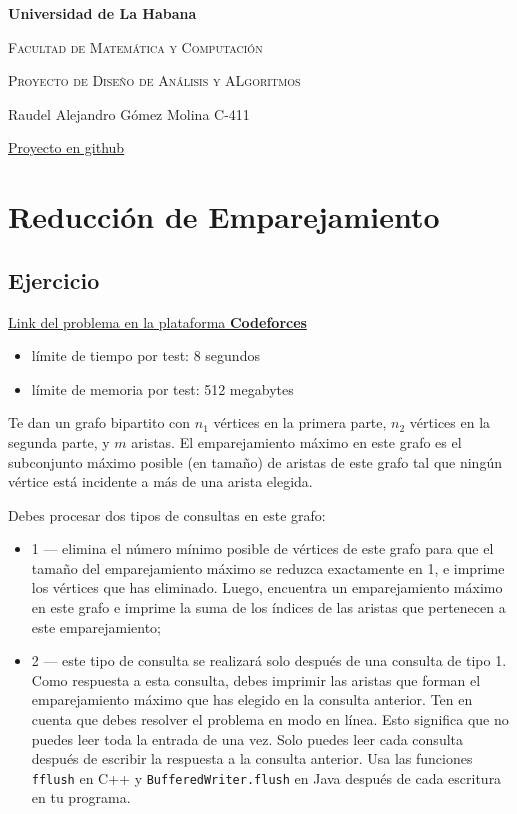 \documentclass{article}
\begin{document}
\begin{titlepage}
    \centering
    {\bfseries\LARGE Universidad de La Habana \par}
    \vspace{1cm}
    {\scshape\Large Facultad de Matemática y Computación \par}
    \vspace{3cm}
    {\scshape\Huge Proyecto de Diseño de Análisis y ALgoritmos\par}
    \vfill

    {\Large Raudel Alejandro Gómez Molina C-411 \par}
    \vfill
    {\href{https://github.com/raudel25/DAA-Project}{Proyecto en github} \par}
\end{titlepage}

\section{Reducción de Emparejamiento}

\subsection{Ejercicio}

\href{https://codeforces.com/contest/1721/problem/F}{Link del problema en la plataforma \textbf{Codeforces}}

\begin{itemize}
    \item límite de tiempo por test: 8 segundos
    \item límite de memoria por test: 512 megabytes
\end{itemize}

Te dan un grafo bipartito con $n_1$ vértices en la primera parte, $n_2$ vértices en la segunda parte, y $m$ aristas. El emparejamiento máximo en este grafo es el subconjunto máximo posible (en tamaño) de aristas de este grafo tal que ningún vértice está incidente a más de una arista elegida.

Debes procesar dos tipos de consultas en este grafo:

\begin{itemize}
    \item 1 — elimina el número mínimo posible de vértices de este grafo para que el tamaño del emparejamiento máximo se reduzca exactamente en 1, e imprime los vértices que has eliminado. Luego, encuentra un emparejamiento máximo en este grafo e imprime la suma de los índices de las aristas que pertenecen a este emparejamiento;
    \item 2 — este tipo de consulta se realizará solo después de una consulta de tipo 1. Como respuesta a esta consulta, debes imprimir las aristas que forman el emparejamiento máximo que has elegido en la consulta anterior.
          Ten en cuenta que debes resolver el problema en modo en línea. Esto significa que no puedes leer toda la entrada de una vez. Solo puedes leer cada consulta después de escribir la respuesta a la consulta anterior. Usa las funciones \texttt{fflush} en C++ y \texttt{BufferedWriter.flush} en Java después de cada escritura en tu programa.
\end{itemize}
\end{document}
